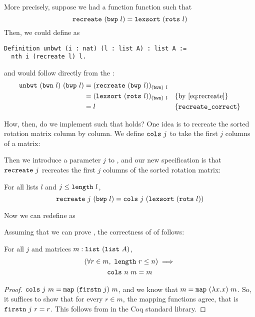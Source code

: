 \documentclass[11pt]{thesis}
\begin{document}
More precisely, suppose we had a function function 
such that
\begin{equation}
  \texttt{recreate}~(\texttt{bwp}~l) = \texttt{lexsort}~(\texttt{rots}~l)
  \label{eq:recreate}
\end{equation}
Then, we could define  as
\begin{lstlisting}
Definition unbwt (i : nat) (l : list A) : list A :=
  nth i (recreate l) l.
\end{lstlisting}
and  would follow directly from the :
\begin{align}
     \label{eq:unbwt_correct_start}
     \var{unbwt}~(\var{bwn}~l)~(\var{bwp}~l)
  &= (\var{recreate}~(\var{bwp}~l))_{(\var{bwn})~l} &&\\
  &= (\var{lexsort}~(\var{rots}~l))_{(\var{bwn})~l}
     &&\text{\{by \Cref{eq:recreate}\}}\\
  &= l &&\text{\{\var{recreate\_correct}\}}
     \label{eq:unbwt_correct_end}
\end{align}

How, then, do we implement  such that
 holds? One idea is to recreate the sorted rotation
matrix column by column. We define $\texttt{cols}~j$ to take the first
$j$ columns of a matrix:

Then we introduce a parameter $j$ to , and our new
specification is that $\texttt{recreate}~j$ recreates the first $j$
columns of the sorted rotation matrix:
\begin{theorem}
  For all lists $l$ and $j \le \texttt{length}~l$,
  \begin{equation}
    \texttt{recreate}~j~(\texttt{bwp}~l) =
    \texttt{cols}~j~(\texttt{lexsort}~(\texttt{rots}~l))
    \label{eq:recreate_correct_ind}
  \end{equation}
\end{theorem}

Now we can redefine  as


Assuming that we can prove , the
correctness of of  follows:

\begin{theorem}[cols\_id]
  For all $j$ and matrices $m : \texttt{list}~(\texttt{list}~A)$,
  \begin{gather*}
    (\forall r \in m,~\texttt{length}~r \le n) \implies \\
    \texttt{cols}~n~m = m
  \end{gather*}
\end{theorem}
\begin{proof}
  $\texttt{cols}~j~m = \texttt{map}~(\texttt{firstn}~j)~m$, and we
  know that $m = \texttt{map}~(\lambda x.x)~m$. So, it suffices to show that
  for every $r \in m$, the mapping functions agree, that is
  $\texttt{firstn}~j~r = r$. This follows from 
  in the Coq standard library.
\end{proof}
\end{document}
